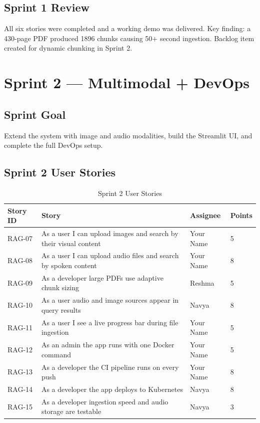 \documentclass[12pt,a4paper]{report}
\begin{document}
\subsection{Sprint 1 Review}
All six stories were completed and a working demo was delivered. Key finding: a 430-page PDF produced 1896 chunks causing 50+ second ingestion. Backlog item created for dynamic chunking in Sprint 2.

\section{Sprint 2 --- Multimodal + DevOps}

\subsection{Sprint Goal}
Extend the system with image and audio modalities, build the Streamlit UI, and complete the full DevOps setup.

\subsection{Sprint 2 User Stories}

\begin{table}[H]
\centering
\caption{Sprint 2 User Stories}
\begin{tabularx}{\textwidth}{p{1.5cm}Xp{2cm}p{2cm}}
\toprule
\textbf{Story ID} & \textbf{Story} & \textbf{Assignee} & \textbf{Points} \\
\midrule
RAG-07 & As a user I can upload images and search by their visual content & Your Name & 5 \\
RAG-08 & As a user I can upload audio files and search by spoken content & Your Name & 8 \\
RAG-09 & As a developer large PDFs use adaptive chunk sizing & Reshma & 5 \\
RAG-10 & As a user audio and image sources appear in query results & Navya & 8 \\
RAG-11 & As a user I see a live progress bar during file ingestion & Your Name & 5 \\
RAG-12 & As an admin the app runs with one Docker command & Your Name & 5 \\
RAG-13 & As a developer the CI pipeline runs on every push & Your Name & 8 \\
RAG-14 & As a developer the app deploys to Kubernetes & Navya & 8 \\
RAG-15 & As a developer ingestion speed and audio storage are testable & Navya & 3 \\
\bottomrule
\end{tabularx}
\end{table}
\end{document}
